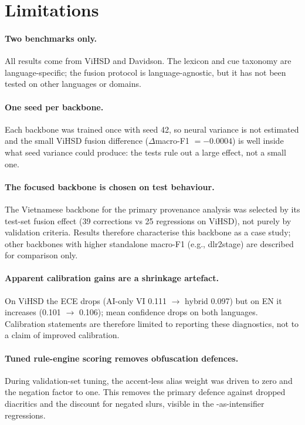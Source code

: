 \section{Limitations}
\label{sec:limitations}

\paragraph{Two benchmarks only.}  All results come from ViHSD and Davidson.
The lexicon and cue taxonomy are language-specific; the fusion protocol is
language-agnostic, but it has not been tested on other languages or domains.

\paragraph{One seed per backbone.}  Each backbone was trained once with seed 42,
so neural variance is not estimated and the small ViHSD fusion difference
($\Delta$macro-F1 $=-0.0004$) is well inside what seed variance could produce:
the tests rule out a large effect, not a small one.

\paragraph{The focused backbone is chosen on test behaviour.}  The Vietnamese
backbone for the primary provenance analysis was selected by its test-set fusion
effect (39 corrections vs 25 regressions on ViHSD), not purely by validation
criteria.  Results therefore characterise this backbone as a case study; other
backbones with higher standalone macro-F1 (e.g., dlr2stage) are described for
comparison only.

\paragraph{Apparent calibration gains are a shrinkage artefact.}  On ViHSD the ECE drops (AI-only VI 0.111 $\to$ hybrid 0.097) but on EN it increases (0.101 $\to$ 0.106); mean confidence drops on both languages. Calibration statements are therefore limited to reporting these diagnostics, not to a claim of improved calibration.

\paragraph{Tuned rule-engine scoring removes obfuscation defences.}  During
validation-set tuning, the accent-less alias weight was driven to zero and the
negation factor to one.  This removes the primary defence against dropped
diacritics and the discount for negated slurs, visible in the
\off{}-as-intensifier regressions.

